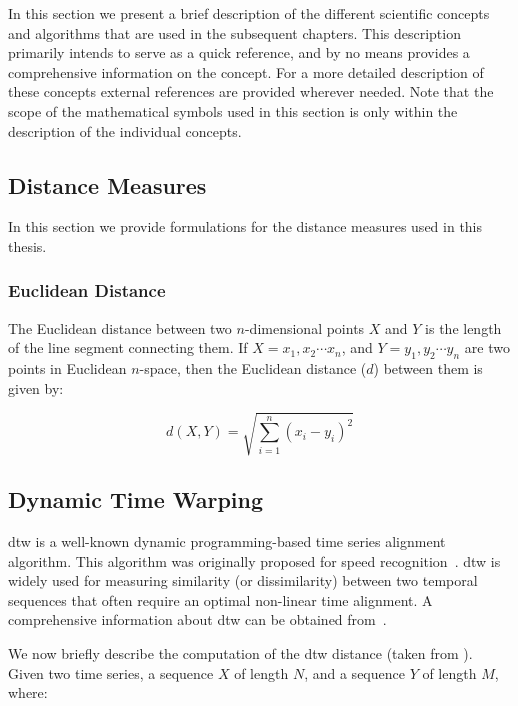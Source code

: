 In this section we present a brief description of the different scientific concepts and algorithms that are used in the subsequent chapters. This description primarily intends to serve as a quick reference, and by no means provides a comprehensive information on the concept. For a more detailed description of these concepts external references are provided wherever needed. Note that the scope of the mathematical symbols used in this section is only within the description of the individual concepts. 

\subsection{Distance Measures}
\label{sec:distance_measures}

In this section we provide formulations for the distance measures used in this thesis. 

\subsubsection{Euclidean Distance}
\label{sec:euclidean_distance}

The Euclidean distance between two $n$-dimensional points $X$ and $Y$ is the length of the line segment connecting them. If $X=x_1, x_2\cdots x_n$, and $Y=y_1, y_2\cdots y_n$ are two points in Euclidean $n$-space, then the Euclidean distance ($d$) between them is given by:

\begin{equation}
\label{eq:euclidean_distance}
	d(X,Y) = \sqrt{\sum_{i=1}^{n}(x_i-y_i)^2}	
\end{equation}



\subsection{Dynamic Time Warping}
\label{sec_DTW_distance_measure}

\Acrfull{dtw} is a well-known dynamic programming-based time series alignment algorithm. This algorithm was originally proposed for speed recognition~\citep{Sakoe78TASLP}. \Gls{dtw} is widely used for measuring similarity (or dissimilarity) between two temporal sequences that often require an optimal non-linear time alignment. A comprehensive information about \gls{dtw} can be obtained from~\cite{muller2007dynamic}. 

We now briefly describe the computation of the \gls{dtw} distance (taken from \cite{Keogh2004,muller2007dynamic}). Given two time series, a sequence  $X$ of length $N$, and a sequence $Y$ of length $M$, where:

